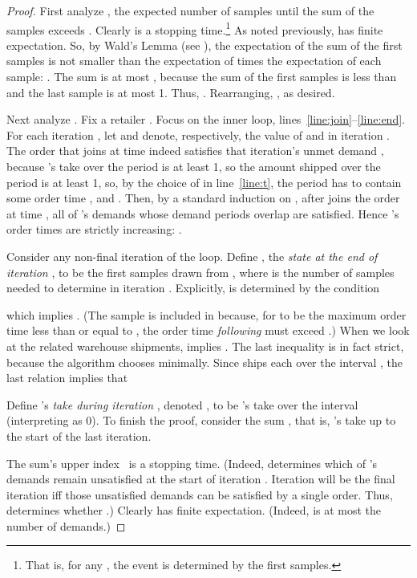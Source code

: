 \begin{proof}
  First analyze , the expected number of samples until the sum
  of the samples exceeds \mbox{}. Clearly  is a
  stopping time.\footnote {That is, for any , the event  is determined by the first  samples.} As noted previously, 
  has finite expectation. So, by Wald's Lemma (see ), the expectation of the sum of the first  samples
  is not smaller than the expectation
  of  times the expectation of each sample: . The sum is at most ,
  because the sum of the first  samples is less than
   and the last sample is at most 1. Thus,
  . Rearranging, , as
  desired.

  \smallskip

  Next analyze .
  Fix a retailer .
  Focus on the inner loop, lines~\ref{line:join}--\ref{line:end}.
  For each iteration ,  let 
  and  denote, respectively, the value of  and 
  in iteration .
  The order that  joins at time 
  indeed satisfies that iteration's unmet demand ,
  because 's take over the period  is at least 1,
  so the amount shipped over the period is at least 1,
  so, by the choice of  in line~\ref{line:t},
  the period has to contain some order time ,
  and .
  Then, by a standard induction on , after  joins the order at time ,
  all of 's demands whose demand periods overlap  are satisfied.
  Hence 's order times are strictly increasing:
  .

  Consider any non-final iteration  of the loop.
  Define ,
  the {\em state at the end of iteration },
  to be the first  samples drawn from ,
  where  is the number of samples
  needed to determine  in iteration .
  Explicitly,  is determined by the condition

  

\noindent
  which implies .
  (The sample  is included in  because,
  for  to be the maximum order time less than or equal to ,
  the order time {\em following}  must exceed .)
  When we look at the related warehouse shipments, 
   implies . 
  The last inequality is in fact strict, 
  because the algorithm chooses  minimally.
  Since  ships each  over the interval ,
  the last relation implies that

  
	
  Define 's {\em take during iteration },
  denoted , to be 's take over the interval 
  (interpreting  as 0).
  To finish the proof,  consider the sum ,
  that is, 's take up to the start of the last iteration.

  The sum's upper index~ is a stopping time.
  (Indeed,  determines 
  which of 's demands remain unsatisfied at the start of iteration .
  Iteration  will be the final iteration 
  iff those unsatisfied demands can be satisfied by a single order.
  Thus,  determines whether .)
  Clearly  has finite expectation.
  (Indeed,  is at most the number of demands.)


\end{proof}
